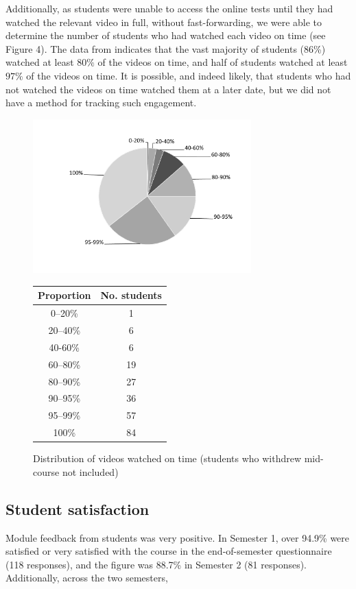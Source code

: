 \documentclass{amsart}
\begin{document}
Additionally, as students were unable to access the online tests until they had watched the relevant video in full, without fast-forwarding, we were able to determine the number of students who had watched each video on time (see Figure 4).  The data from indicates that the vast majority of students (86\%) watched at least $80\%$ of the videos on time, and half of students watched at least $97\%$ of the videos on time.  It is possible, and indeed likely, that students who had not watched the videos on time watched them at a later date, but we did not have a method for tracking such engagement.

\begin{center}
\begin{figure}[hbt]
\includegraphics[width=0.75\textwidth]{figure4.pdf} 
\begin{tabular}{cc}
Proportion & No. students\\\hline
0--20\% & 1\\
20--40\% & 6\\
40-60\% & 6\\
60--80\% & 19\\
80--90\% & 27\\
90--95\% & 36\\
95--99\% & 57\\
100\% & 84
\end{tabular}
\caption{Distribution of videos watched on time (students who withdrew mid-course not included)}
\end{figure}
\end{center}

\subsection*{Student satisfaction}

Module feedback from students was very positive. In Semester 1, over 94.9\% were satisfied or very satisfied with the course in the end-of-semester questionnaire (118 responses), and the figure was 88.7\% in Semester 2 (81 responses). Additionally, across the two semesters,
\end{document}
